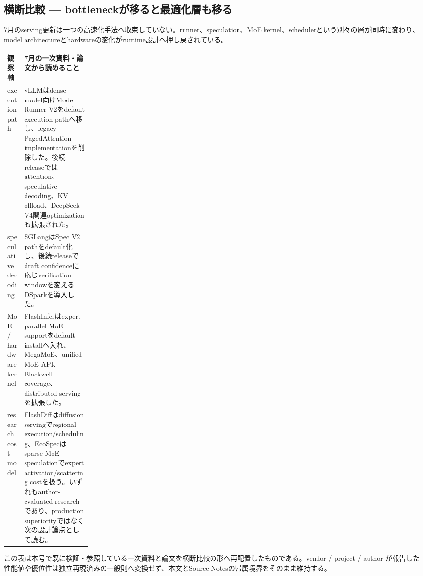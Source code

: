 \subsection*{横断比較 — bottleneckが移ると最適化層も移る}
7月のserving更新は一つの高速化手法へ収束していない。runner、speculation、MoE kernel、schedulerという別々の層が同時に変わり、model architectureとhardwareの変化がruntime設計へ押し戻されている。
\medskip
\begin{center}
\small
\renewcommand{\arraystretch}{1.16}
\begin{tabularx}{\linewidth}{@{}p{0.20\linewidth}X@{}}
\toprule
観察軸 & 7月の一次資料・論文から読めること \\
\midrule
execution path & vLLMはdense model向けModel Runner V2をdefault execution pathへ移し、legacy PagedAttention implementationを削除した。後続releaseではattention、speculative decoding、KV offload、DeepSeek-V4関連optimizationも拡張された。 \cite{src-76c7b104c7df,src-b811cc97eff4} \\
speculative decoding & SGLangはSpec V2 pathをdefault化し、後続releaseでdraft confidenceに応じverification windowを変えるDSparkを導入した。 \cite{src-5a9041d41ad0,src-bf2a6d1b9b56} \\
MoE / hardware kernel & FlashInferはexpert-parallel MoE supportをdefault installへ入れ、MegaMoE、unified MoE API、Blackwell coverage、distributed servingを拡張した。 \cite{src-b80517d03022,src-020bbc9ce508} \\
research cost model & FlashDiffはdiffusion servingでregional execution/scheduling、EcoSpecはsparse MoE speculationでexpert activation/scattering costを扱う。いずれもauthor-evaluated researchであり、production superiorityではなく次の設計論点として読む。 \cite{src-50e29a09d75a,src-d6756f2b6aa6} \\
\bottomrule
\end{tabularx}
\renewcommand{\arraystretch}{1.0}
\end{center}
\normalsize
\begin{claimboundary}[この比較の境界]
この表は本号で既に検証・参照している一次資料と論文を横断比較の形へ再配置したものである。vendor / project / author が報告した性能値や優位性は独立再現済みの一般則へ変換せず、本文とSource Notesの帰属境界をそのまま維持する。
\end{claimboundary}
